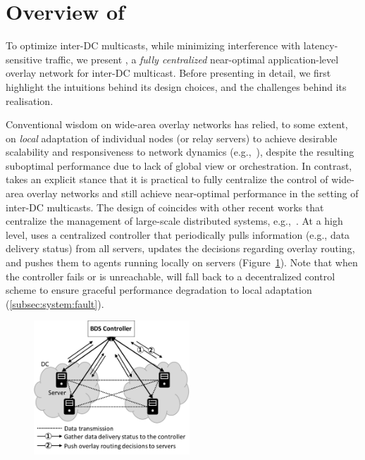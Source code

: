 \section{Overview of \name}
\label{sec:overview}

To optimize inter-DC multicasts, while minimizing interference with
latency-sensitive traffic, we present {\em \name}, a {\em fully centralized}
near-optimal application-level overlay network for inter-DC multicast.
Before presenting \name in detail, we first highlight the intuitions
behind its design choices, and the challenges behind its realisation.


Conventional wisdom on wide-area overlay networks has relied, to
some extent, on {\em local} adaptation of individual nodes (or
relay servers) to achieve desirable scalability and responsiveness
to network dynamics
(e.g.,~\cite{Andreev2013Designing,Repantis2010Scaling,Huang2014A,mukerjee2014enabling}),
despite the resulting suboptimal performance due to lack of global
view or orchestration.
In contrast, \name takes an explicit stance that it is practical to
fully centralize the control of wide-area overlay networks and
still achieve near-optimal performance in the setting of inter-DC
multicasts. The design of \name coincides with other recent works that centralize the
management of large-scale distributed systems, e.g.,~\cite{gog2016firmament}.
At a high level, \name uses a centralized controller that
periodically pulls information (e.g., data delivery status) from all
servers, updates the decisions regarding overlay routing, and pushes
them to agents running locally on servers
(Figure~\ref{fig:framework}).
Note that when the controller fails or is unreachable, \name will
fall back to a decentralized control scheme to ensure graceful
performance degradation to local adaptation
(\Section\ref{subsec:system:fault}).

\begin{figure}[t]
  \centering
  \includegraphics[width=2.3in]{images/framework-new.pdf}
    \vspace{-0.2cm}
  \label{fig:framework}
\vspace{-0.4cm}
\end{figure}

